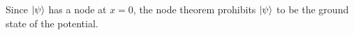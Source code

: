 \begin{sol}
\begin{enumerate}[label=\textbf{(\alph*)}]
	
	Since $\ket\psi$ has a node at $x=0$, the node theorem prohibits $\ket\psi$ to be the ground state of the potential.
\end{enumerate}
\end{sol}